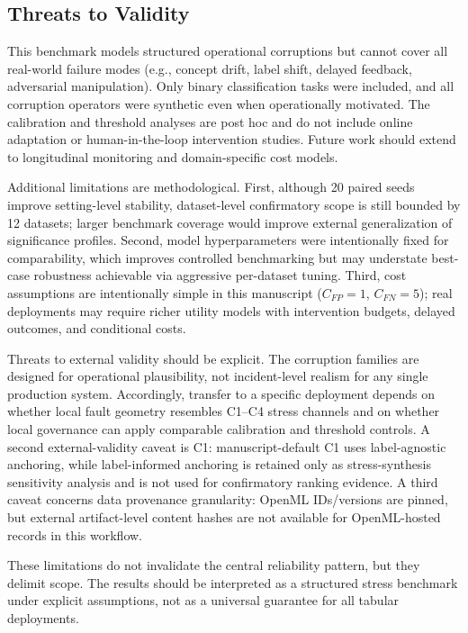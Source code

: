 \documentclass{AuthorGuide/ijitcs}
\begin{document}
\subsection{Threats to Validity}
This benchmark models structured operational corruptions but cannot cover all real-world failure modes (e.g., concept drift, label shift, delayed feedback, adversarial manipulation). Only binary classification tasks were included, and all corruption operators were synthetic even when operationally motivated. The calibration and threshold analyses are post hoc and do not include online adaptation or human-in-the-loop intervention studies. Future work should extend to longitudinal monitoring and domain-specific cost models.

Additional limitations are methodological. First, although 20 paired seeds improve setting-level stability, dataset-level confirmatory scope is still bounded by 12 datasets; larger benchmark coverage would improve external generalization of significance profiles. Second, model hyperparameters were intentionally fixed for comparability, which improves controlled benchmarking but may understate best-case robustness achievable via aggressive per-dataset tuning. Third, cost assumptions are intentionally simple in this manuscript ($C_{FP}=1$, $C_{FN}=5$); real deployments may require richer utility models with intervention budgets, delayed outcomes, and conditional costs.

Threats to external validity should be explicit. The corruption families are designed for operational plausibility, not incident-level realism for any single production system. Accordingly, transfer to a specific deployment depends on whether local fault geometry resembles C1--C4 stress channels and on whether local governance can apply comparable calibration and threshold controls. A second external-validity caveat is C1: manuscript-default C1 uses label-agnostic anchoring, while label-informed anchoring is retained only as stress-synthesis sensitivity analysis and is not used for confirmatory ranking evidence. A third caveat concerns data provenance granularity: OpenML IDs/versions are pinned, but external artifact-level content hashes are not available for OpenML-hosted records in this workflow.

These limitations do not invalidate the central reliability pattern, but they delimit scope. The results should be interpreted as a structured stress benchmark under explicit assumptions, not as a universal guarantee for all tabular deployments.
\end{document}
